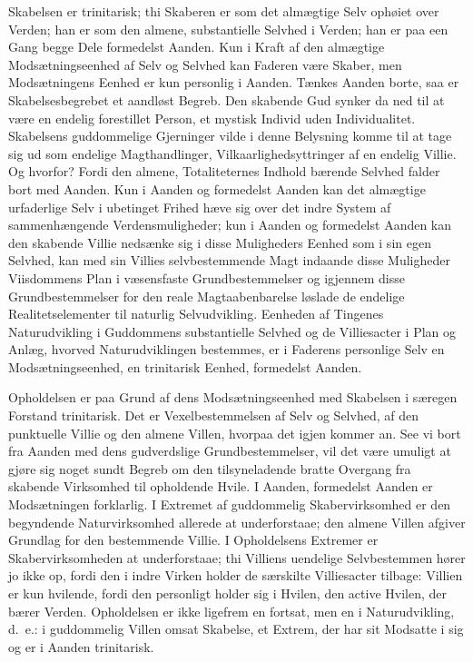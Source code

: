 \documentclass[12pt]{book}
\begin{document}
Skabelsen er trinitarisk; thi Skaberen er som det almægtige Selv
ophøiet over Verden; han er som den almene, substantielle Selvhed i
Verden; han er paa een Gang begge Dele formedelst Aanden. Kun i
Kraft af den almægtige Modsætningseenhed af Selv og Selvhed kan
Faderen være Skaber, men Modsætningens Eenhed er kun personlig i
Aanden. Tænkes Aanden borte, saa er Skabelsesbegrebet et aandløst
Begreb. Den skabende Gud synker da ned til at være en endelig
forestillet Person, et mystisk Individ uden Individualitet.
Skabelsens guddommelige Gjerninger vilde i denne Belysning komme til
at tage sig ud som endelige Magthandlinger, Vilkaarlighedsyttringer
af en endelig Villie. Og hvorfor? Fordi den almene, Totaliteternes
Indhold bærende Selvhed falder bort med Aanden. Kun i Aanden og
formedelst Aanden kan det almægtige urfaderlige Selv i ubetinget
Frihed hæve sig over det indre System af sammenhængende
Verdensmuligheder; kun i Aanden og formedelst Aanden kan den
skabende Villie nedsænke sig i disse Muligheders Eenhed som i sin
egen Selvhed, kan med sin Villies selvbestemmende Magt indaande
disse Muligheder Viisdommens Plan i væsensfaste Grundbestemmelser og
igjennem disse Grundbestemmelser for den reale Magtaabenbarelse
løslade de endelige Realitetselementer til naturlig Selvudvikling.
Eenheden af Tingenes Naturudvikling i Guddommens substantielle
Selvhed og de Villiesacter i Plan og Anlæg, hvorved
Naturudviklingen bestemmes, er i Faderens personlige Selv en
Modsætningseenhed, en trinitarisk Eenhed, formedelst Aanden.

Opholdelsen er paa Grund af dens Modsætningseenhed med Skabelsen i
særegen Forstand trinitarisk. Det er Vexelbestemmelsen af Selv og
Selvhed, af den punktuelle Villie og den almene Villen, hvorpaa det
igjen kommer an. See vi bort fra Aanden med dens gudverdslige
Grundbestemmelser, vil det være umuligt at gjøre sig
noget sundt Begreb om den tilsyneladende bratte Overgang fra
skabende Virksomhed til opholdende Hvile. I Aanden, formedelst
Aanden er Modsætningen forklarlig. I Extremet af guddommelig
Skabervirksomhed er den begyndende Naturvirksomhed allerede at
underforstaae; den almene Villen afgiver Grundlag for den
bestemmende Villie. I Opholdelsens Extremer er Skabervirksomheden at
underforstaae; thi Villiens uendelige Selvbestemmen hører jo ikke
op, fordi den i indre Virken holder de særskilte Villiesacter
tilbage: Villien er kun hvilende, fordi den personligt holder sig i
Hvilen, den active Hvilen, der bærer Verden. Opholdelsen er ikke
ligefrem en fortsat, men en i Naturudvikling, d.\ e.: i guddommelig
Villen omsat Skabelse, et Extrem, der har sit Modsatte i sig og er i
Aanden trinitarisk.
\end{document}
